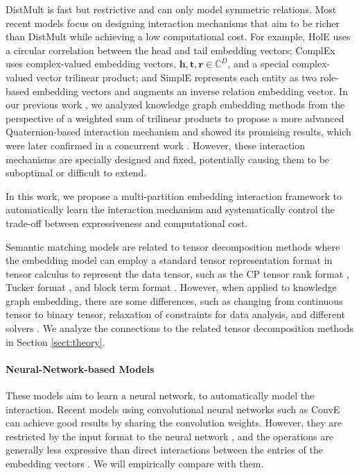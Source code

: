 \documentclass{ecai}
\def\vh{{\bm{h}}}
\def\vr{{\bm{r}}}
\def\vt{{\bm{t}}}
\def\sC{{\mathbb{C}}}
\theoremstyle{plain}  \newtheorem{thm}{Theorem}  \newtheorem{lem}[thm]{Lemma}  \newtheorem{prop}[thm]{Proposition}
\theoremstyle{remark}  \newtheorem*{rem}{Remark}
\begin{document}
DistMult is fast but restrictive and can only model symmetric relations. Most recent models focus on designing interaction mechanisms that aim to be richer than DistMult while achieving a low computational cost. For example, HolE \cite{nickel_holographicembeddingsknowledge_2016} uses a circular correlation between the head and tail embedding vectors; ComplEx \cite{trouillon_complexembeddingssimple_2016} uses complex-valued embedding vectors, $ \vh, \vt, \vr \in \sC^D $, and a special complex-valued vector trilinear product; and SimplE \cite{kazemi_simpleembeddinglink_2018,lacroix_canonicaltensordecomposition_2018} represents each entity as two role-based embedding vectors and augments an inverse relation embedding vector. In our previous work \cite{tran_analyzingknowledgegraph_2019}, we analyzed knowledge graph embedding methods from the perspective of a weighted sum of trilinear products to propose a more advanced Quaternion-based interaction mechanism and showed its promising results, which were later confirmed in a concurrent work \cite{zhang_quaternionknowledgegraph_2019}. However, these interaction mechanisms are specially designed and fixed, potentially causing them to be suboptimal or difficult to extend.

In this work, we propose a multi-partition embedding interaction framework to automatically learn the interaction mechanism and systematically control the trade-off between expressiveness and computational cost.

Semantic matching models are related to tensor decomposition methods where the embedding model can employ a standard tensor representation format in tensor calculus to represent the data tensor, such as the CP tensor rank format \cite{hitchcock_expressiontensorpolyadic_1927}, Tucker format \cite{tucker_mathematicalnotesthreemode_1966}, and block term format \cite{delathauwer_decompositionshigherordertensor_2008a}. However, when applied to knowledge graph embedding, there are some differences, such as changing from continuous tensor to binary tensor, relaxation of constraints for data analysis, and different solvers \cite{kolda_tensordecompositionsapplications_2009}. We analyze the connections to the related tensor decomposition methods in Section \ref{sect:theory}.

\paragraph{Neural-Network-based Models}
These models aim to learn a neural network, to automatically model the interaction. Recent models using convolutional neural networks such as ConvE \cite{dettmers_convolutional2dknowledge_2018} can achieve good results by sharing the convolution weights. However, they are restricted by the input format to the neural network \cite{dettmers_convolutional2dknowledge_2018}, and the operations are generally less expressive than direct interactions between the entries of the embedding vectors \cite{nickel_holographicembeddingsknowledge_2016}. We will empirically compare with them.
\end{document}

